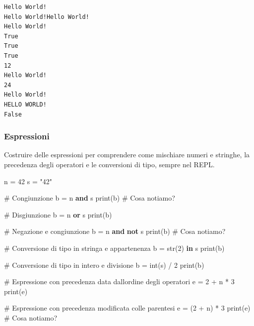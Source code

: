 \documentclass[
  letterpaper,
]{scrbook}
\newenvironment{Shaded}{\begin{snugshade}}{\end{snugshade}}
\newcommand{\BuiltInTok}[1]{\textcolor[rgb]{0.00,0.23,0.31}{#1}}
\newcommand{\CommentTok}[1]{\textcolor[rgb]{0.37,0.37,0.37}{#1}}
\newcommand{\DecValTok}[1]{\textcolor[rgb]{0.68,0.00,0.00}{#1}}
\newcommand{\KeywordTok}[1]{\textcolor[rgb]{0.00,0.23,0.31}{\textbf{#1}}}
\newcommand{\NormalTok}[1]{\textcolor[rgb]{0.00,0.23,0.31}{#1}}
\newcommand{\OperatorTok}[1]{\textcolor[rgb]{0.37,0.37,0.37}{#1}}
\newcommand{\StringTok}[1]{\textcolor[rgb]{0.13,0.47,0.30}{#1}}
\begin{document}
\begin{verbatim}
Hello World!
Hello World!Hello World!
Hello World!
True
True
True
12
Hello World!
24
Hello World!
HELLO WORLD!
False
\end{verbatim}

\subsubsection{Espressioni}\label{espressioni-1}

\begin{tcolorbox}[enhanced jigsaw, leftrule=.75mm, arc=.35mm, opacityback=0, rightrule=.15mm, titlerule=0mm, colbacktitle=quarto-callout-tip-color!10!white, colback=white, colframe=quarto-callout-tip-color-frame, bottomrule=.15mm, toprule=.15mm, bottomtitle=1mm, toptitle=1mm, title=\textcolor{quarto-callout-tip-color}{\faLightbulb}\hspace{0.5em}{Suggerimento}, breakable, coltitle=black, opacitybacktitle=0.6, left=2mm]

Costruire delle espressioni per comprendere come mischiare numeri e
stringhe, la precedenza degli operatori e le conversioni di tipo, sempre
nel REPL.

\end{tcolorbox}

\begin{Shaded}
\begin{Highlighting}[]
\NormalTok{n }\OperatorTok{=} \DecValTok{42}
\NormalTok{s }\OperatorTok{=} \StringTok{"42"}

\CommentTok{\# Congiunzione}
\NormalTok{b }\OperatorTok{=}\NormalTok{ n }\KeywordTok{and}\NormalTok{ s}
\BuiltInTok{print}\NormalTok{(b) }\CommentTok{\# Cosa notiamo?}

\CommentTok{\# Disgiunzione}
\NormalTok{b }\OperatorTok{=}\NormalTok{ n }\KeywordTok{or}\NormalTok{ s}
\BuiltInTok{print}\NormalTok{(b) }

\CommentTok{\# Negazione e congiunzione}
\NormalTok{b }\OperatorTok{=}\NormalTok{ n }\KeywordTok{and} \KeywordTok{not}\NormalTok{ s}
\BuiltInTok{print}\NormalTok{(b) }\CommentTok{\# Cosa notiamo?}

\CommentTok{\# Conversione di tipo in stringa e appartenenza}
\NormalTok{b }\OperatorTok{=} \BuiltInTok{str}\NormalTok{(}\DecValTok{2}\NormalTok{) }\KeywordTok{in}\NormalTok{ s}
\BuiltInTok{print}\NormalTok{(b)}

\CommentTok{\# Conversione di tipo in intero e divisione}
\NormalTok{b }\OperatorTok{=} \BuiltInTok{int}\NormalTok{(s) }\OperatorTok{/} \DecValTok{2}
\BuiltInTok{print}\NormalTok{(b)}

\CommentTok{\# Espressione con precedenza data dall\textquotesingle{}ordine degli operatori }
\NormalTok{e }\OperatorTok{=} \DecValTok{2} \OperatorTok{+}\NormalTok{ n }\OperatorTok{*} \DecValTok{3}
\BuiltInTok{print}\NormalTok{(e)}

\CommentTok{\# Espressione con precedenza modificata colle parentesi }
\NormalTok{e }\OperatorTok{=}\NormalTok{ (}\DecValTok{2} \OperatorTok{+}\NormalTok{ n) }\OperatorTok{*} \DecValTok{3}
\BuiltInTok{print}\NormalTok{(e) }\CommentTok{\# Cosa notiamo?}
\end{Highlighting}
\end{Shaded}
\end{document}
